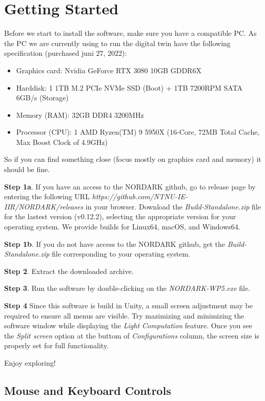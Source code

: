 \section{Getting Started} \label{started}

Before we start to install the software, make sure you have a compatible PC. As the PC we are currently using to run the digital twin have the following specification (purchased juni 27, 2022):
\begin{itemize}
    \item Graphics card: Nvidia GeForce RTX 3080 10GB GDDR6X
    \item Harddisk: 1 1TB M.2 PCIe NVMe SSD (Boot) + 1TB 7200RPM SATA 6GB/s (Storage)
    \item Memory (RAM): 32GB DDR4 3200MHz
    \item Processor (CPU): 1 AMD Ryzen(TM) 9 5950X (16-Core, 72MB Total Cache, Max Boost Clock of 4.9GHz)
\end{itemize}
So if you can find something close (focus mostly on graphics card and memory) it should be fine.

\textbf{Step 1a}. If you have an access to the NORDARK github, go to release page by entering the following URL \textit{https://github.com/NTNU-IE-IIR/NORDARK/releases} in your browser. Download the \textit{Build-Standalone.zip} file for the lastest version (v0.12.2), selecting the appropriate version for your operating system. We provide builds for Linux64, macOS, and Windows64. 

\textbf{Step 1b}. If you do not have access to the NORDARK github, get the \textit{Build-Standalone.zip} file corresponding to your operating system.

\textbf{Step 2}. Extract the downloaded archive.

\textbf{Step 3}. Run the software by double-clicking on the \textit{NORDARK-WP5.exe} file.

\textbf{Step 4} Since this software is build in Unity, a small screen adjustment may be required to ensure all menus are visible. Try mazimizing and minimizing the software window while displaying the \textit{Light Computation} feature. Once you see the \textit{Split screen} option at the buttom of \textit{Configurations} column, the screen size is properly set for full functionality.

Enjoy exploring! 


\subsection{Mouse and Keyboard Controls}

